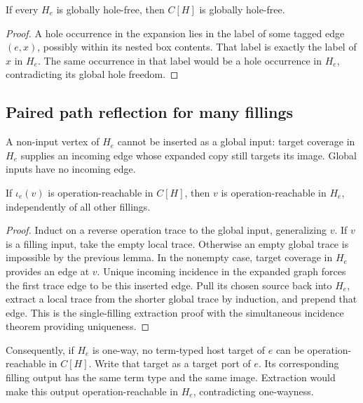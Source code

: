 \begin{lemma}
If every $H_e$ is globally hole-free, then $C[H]$ is globally hole-free.
\end{lemma}
\begin{proof}
A hole occurrence in the expansion lies in the label of some tagged edge
$(e,x)$, possibly within its nested box contents. That label is exactly the
label of $x$ in $H_e$. The same occurrence in that label would be a hole
occurrence in $H_e$, contradicting its global hole freedom.
\end{proof}

\subsection{Paired path reflection for many fillings}
A non-input vertex of $H_e$ cannot be inserted as a global input: target
coverage in $H_e$ supplies an incoming edge whose expanded copy still targets
its image. Global inputs have no incoming edge.

\begin{theorem}
If $\iota_e(v)$ is operation-reachable in $C[H]$, then $v$ is
operation-reachable in $H_e$, independently of all other fillings.
\end{theorem}
\begin{proof}
Induct on a reverse operation trace to the global input, generalizing $v$.
If $v$ is a filling input, take the empty local trace. Otherwise an empty
global trace is impossible by the previous lemma. In the nonempty case,
target coverage in $H_e$ provides an edge at $v$. Unique incoming incidence
in the expanded graph forces the first trace edge to be this inserted edge.
Pull its chosen source back into $H_e$, extract a local trace from the shorter
global trace by induction, and prepend that edge. This is the single-filling
extraction proof with the simultaneous incidence theorem providing uniqueness.
\end{proof}

Consequently, if $H_e$ is one-way, no term-typed host target of $e$ can be
operation-reachable in $C[H]$. Write that target as a target port of $e$.
Its corresponding filling output has the same term type and the same image.
Extraction would make this output operation-reachable in $H_e$, contradicting
one-wayness.

